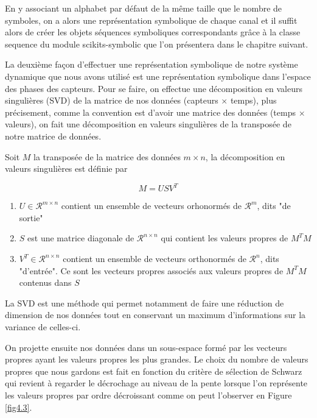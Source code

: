 En y associant un alphabet par défaut de la même taille que le nombre de symboles, on a alors une représentation symbolique de chaque canal et il suffit alors de créer les objets séquences symboliques correspondants grâce à la classe sequence du module scikits-symbolic que l'on présentera dans le chapitre suivant.

\vspace{2ex}
La deuxième façon d'effectuer une représentation symbolique de notre système dynamique que nous avons utilisé est une représentation symbolique dans l'espace des phases des capteurs. 
Pour se faire, on effectue une décomposition en valeurs singulières (SVD) \cite{20} de la matrice de nos données (capteurs $\times$ temps), plus précisement, comme la convention est d'avoir une matrice des données (temps $\times$ valeurs), on fait une décomposition en valeurs singulières de la transposée de notre matrice de données.

\vspace{2ex}
Soit $M$ la transposée de la matrice des données $m \times n$, la décomposition en valeurs singulières est définie par 

\begin{equation}
	M = USV^T
\end{equation}

\begin{enumerate}
	\item $U \in \mathcal{R}^{m \times n}$ contient un ensemble de vecteurs orhonormés de $\mathcal{R}^{m}$, dits "de sortie"
	\item $S$ est une matrice diagonale de $\mathcal{R}^{n \times n}$ qui contient les valeurs propres de $M^TM$
	\item $V^T \in \mathcal{R}^{n \times n}$ contient un ensemble de vecteurs orthonormés de $\mathcal{R}^{n}$, dits "d'entrée". Ce sont les vecteurs propres associés aux valeurs propres de $M^TM$ contenus dans $S$
\end{enumerate}

La SVD est une méthode qui permet notamment de faire une réduction de dimension de nos données tout en conservant un maximum d'informations sur la variance de celles-ci. 

\vspace{2ex}
On projette ensuite nos données dans un sous-espace formé par les vecteurs propres ayant les valeurs propres les plus grandes. Le choix du nombre de valeurs propres que nous gardons est fait en fonction du critère de sélection de Schwarz \cite{19} qui revient à regarder le décrochage au niveau de la pente lorsque l'on représente les valeurs propres par ordre décroissant comme on peut l'observer en Figure \ref{fig4.3}. 

